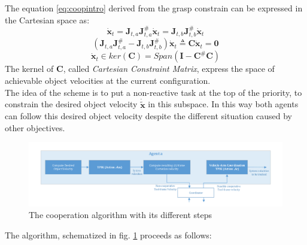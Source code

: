 The equation \eqref{eq:coopintro} derived from the grasp constrain can be expressed in the Cartesian space as:
\begin{equation}
	\dot{\boldsymbol{x}}_t = \boldsymbol{J}_{t,a} \boldsymbol{J}^\#_{t,a} \dot{\boldsymbol{x}}_t =  \boldsymbol{J}_{t,b} \boldsymbol{J}^\#_{t,b} 
	\dot{\boldsymbol{x}}_t 
\end{equation}
\begin{equation}
\label{eq:constrainMatrixC}
	(\boldsymbol{J}_{t,a} \boldsymbol{J}^\#_{t,a} - \boldsymbol{J}_{t,b} \boldsymbol{J}^\#_{t,b}) 
	\dot{\boldsymbol{x}}_t \triangleq \boldsymbol{C} \dot{\boldsymbol{x}}_t = \boldsymbol{0}
\end{equation}
\begin{equation}
	\dot{\boldsymbol{x}}_t \in ker(\boldsymbol{C}) = Span(\boldsymbol{I} - \boldsymbol{C}^\#\boldsymbol{C})
\end{equation}
The kernel of $\boldsymbol{C}$, called \textit{Cartesian Constraint Matrix}, express the space of achievable object velocities at the current configuration.\\
The idea of the scheme is to put a non-reactive task at the top of the priority, to constrain the desired object velocity $\dot{\boldsymbol{\tilde{x}}}$ in this subspace. In this way both agents can follow this desired object velocity despite the different situation caused by other objectives.\\
\begin{figure}[H]
	\begin{center}
		\includegraphics[width=1\columnwidth]{coopScheme.png}
		\caption{The cooperation algorithm with its different steps }\label{fig:coopScheme}
	\end{center}
\end{figure}
The algorithm, schematized in fig. \ref{fig:coopScheme} proceeds as follows:
